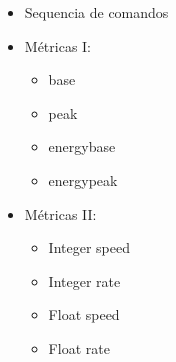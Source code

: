\begin{itemize}
    \item Sequencia de comandos 
    \item Métricas I:
    \begin{itemize}
        \item base
        \item peak
        \item energy\textunderscore base 
        \item energy\textunderscore peak
    \end{itemize}
    \item Métricas II:
    \begin{itemize}
        \item Integer speed 
        \item Integer rate 
        \item Float speed 
        \item Float rate 
    \end{itemize}
\end{itemize}
